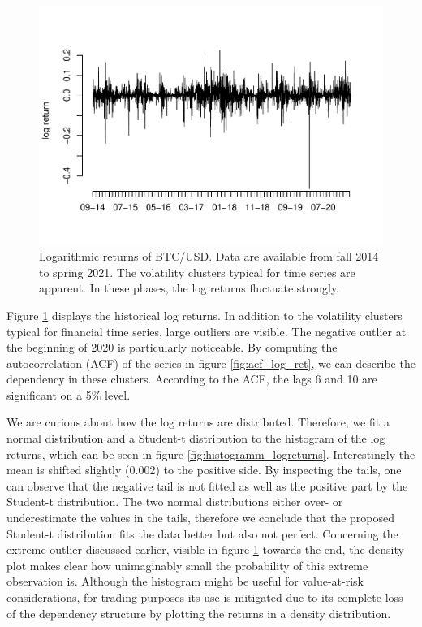 \documentclass[
]{article}
\begin{document}
\begin{figure}

{\centering \includegraphics[width=0.85\linewidth]{00_main_files/figure-latex/log_ret-1} 

}

\caption{Logarithmic returns of BTC/USD. Data are available from fall 2014 to spring 2021. The volatility clusters typical for time series are apparent. In these phases, the log returns fluctuate strongly.}\label{fig:log_ret}
\end{figure}

Figure \ref{fig:log_ret} displays the historical log returns. In
addition to the volatility clusters typical for financial time series,
large outliers are visible. The negative outlier at the beginning of
2020 is particularly noticeable. By computing the autocorrelation (ACF)
of the series in figure \ref{fig:acf_log_ret}, we can describe the
dependency in these clusters. According to the ACF, the lags 6 and 10
are significant on a 5\% level.

We are curious about how the log returns are distributed. Therefore, we
fit a normal distribution and a Student-t distribution to the histogram
of the log returns, which can be seen in figure
\ref{fig:histogramm_logreturns}. Interestingly the mean is shifted
slightly (0.002) to the positive side. By inspecting the tails, one can
observe that the negative tail is not fitted as well as the positive
part by the Student-t distribution. The two normal distributions either
over- or underestimate the values in the tails, therefore we conclude
that the proposed Student-t distribution fits the data better but also
not perfect. Concerning the extreme outlier discussed earlier, visible
in figure \ref{fig:log_ret} towards the end, the density plot makes
clear how unimaginably small the probability of this extreme observation
is. Although the histogram might be useful for value-at-risk
considerations, for trading purposes its use is mitigated due to its
complete loss of the dependency structure by plotting the returns in a
density distribution.
\end{document}
